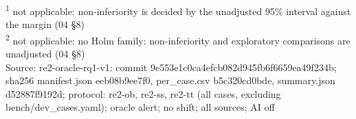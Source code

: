 \begin{table}[t]
\par\smallskip\footnotesize
\textsuperscript{1} not applicable: non-inferiority is decided by the unadjusted 95\% interval against the margin (04 \S{}8)\\
\textsuperscript{2} not applicable: no Holm family: non-inferiority and exploratory comparisons are unadjusted (04 \S{}8)\\
Source: re2-oracle-rq1-v1: commit 9e553e1c0ca4efcb082d945fb6f6659ea49f234b; sha256 manifest.json eeb08b9ee7f0, per\_case.csv b5c320cd0bde, summary.json d52887f9192d; protocol: re2-ob, re2-ss, re2-tt (all cases, excluding bench/dev\_cases.yaml); oracle alert; no shift; all sources; AI off\\
\end{table}
